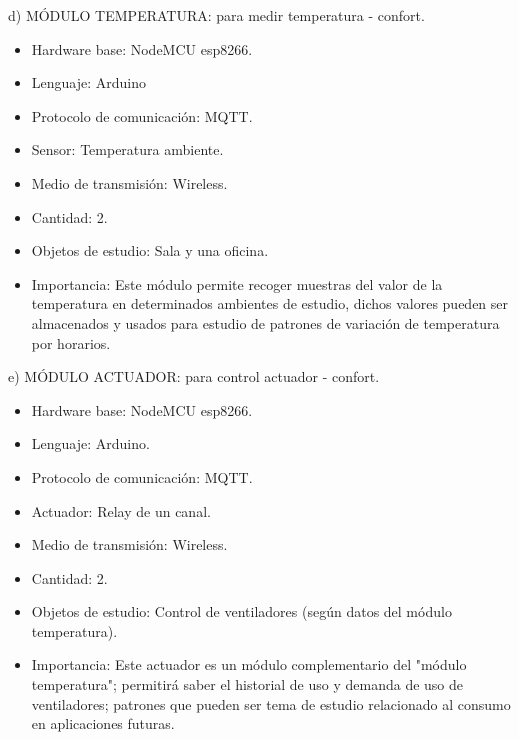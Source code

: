 \documentclass[11pt]{charter}
\begin{document}
d) MÓDULO TEMPERATURA: para medir temperatura - confort.
\begin{itemize}
\item Hardware base: NodeMCU esp8266.
\item Lenguaje: Arduino
\item Protocolo de comunicación: MQTT.
\item Sensor: Temperatura ambiente.
\item Medio de transmisión: Wireless.
\item Cantidad: 2.
\item Objetos de estudio: Sala y una oficina.
\item Importancia: Este módulo permite recoger muestras del valor de la temperatura en determinados ambientes de estudio, dichos valores pueden ser almacenados y usados para estudio de patrones de variación de temperatura por horarios.
\end{itemize}

e) MÓDULO ACTUADOR: para control actuador - confort.
\begin{itemize}
\item Hardware base: NodeMCU esp8266.
\item Lenguaje: Arduino.
\item Protocolo de comunicación: MQTT.
\item Actuador: Relay de un canal.
\item Medio de transmisión: Wireless.
\item Cantidad: 2.
\item Objetos de estudio: Control de ventiladores (según datos del módulo temperatura).
\item Importancia: Este actuador es un módulo complementario del "módulo temperatura"; permitirá saber el historial de uso y demanda de uso de ventiladores; patrones que pueden ser tema de estudio relacionado al consumo en aplicaciones futuras.
\end{itemize}
\end{document}
